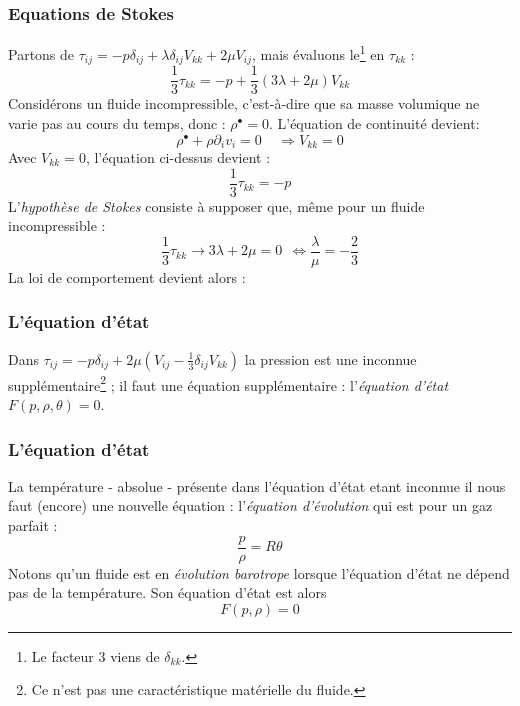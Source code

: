 \subsubsection{Equations de Stokes}
Partons de $\tau_{ij} = -p\delta_{ij} + \lambda\delta_{ij}V_{kk} + 2\mu V_{ij}$, mais
évaluons le\footnote{Le facteur 3 viens de $\delta_{kk}$.} en $\tau_{kk}$ :
\begin{equation}
	\frac{1}{3}\tau_{kk} = -p + \frac{1}{3}(3\lambda + 2\mu)V_{kk}
\end{equation}
Considérons un fluide incompressible, c'est-à-dire que sa masse volumique ne varie
pas au cours du temps, donc : $\rho^\bullet = 0$. L'équation de continuité devient:
\begin{equation}
	\rho^\bullet + \rho \partial_i v_i = 0\ \ \ \ \ \Rightarrow V_{kk} = 0
\end{equation}
Avec $V_{kk} = 0$, l'équation ci-dessus devient :
\begin{equation}
	\frac{1}{3}\tau_{kk} = -p
\end{equation}
L'\textit{hypothèse de Stokes} consiste à supposer que, même pour un fluide 
incompressible :
\begin{equation}
	\frac{1}{3}\tau_{kk} \rightarrow 3\lambda + 2\mu = 0\ \ \Leftrightarrow 
	\frac{\lambda}{\mu} = -\frac{2}{3}
\end{equation}
La loi de comportement devient alors :\\
        
        
        
\subsubsection{L'équation d'état}
Dans $\tau_{ij} = -p\delta_{ij} + 2\mu\left(V_{ij} - \frac{1}{3}\delta_{ij}V_{kk}
\right)$ la pression est une inconnue supplémentaire\footnote{Ce n'est pas une
caractéristique matérielle du fluide.} ; il faut une équation supplémentaire :
l'\textit{équation d'état} $F(p,\rho,\theta) = 0$.\\
        
\subsubsection{L'équation d'état}
La température - absolue - présente dans l'équation d'état etant inconnue il nous
faut (encore) une nouvelle équation : l'\textit{équation d'évolution} qui est pour un gaz
parfait :
\begin{equation}
	\frac{p}{\rho} = R\theta
\end{equation}
Notons qu'un fluide est en \textit{évolution barotrope} lorsque l'équation d'état
ne dépend pas de la température. Son équation d'état est alors
\begin{equation}
	F(p,\rho) = 0
\end{equation}
    
